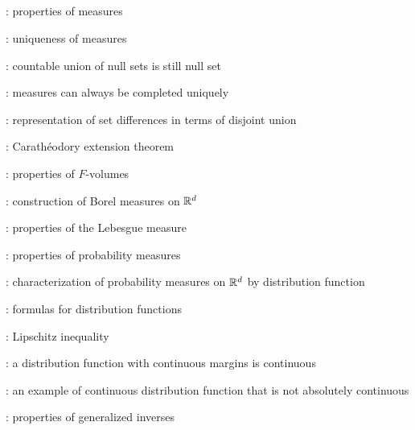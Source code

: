 \subsection*{}
\item {}: properties of measures
\item {}: uniqueness of measures
\item {}: countable union of null sets is still null set
\item {}: measures can always be completed uniquely
\item {}: representation of set differences in terms of disjoint union
\item {}: Carath\'eodory extension theorem
\item {}: properties of \(F\)-volumes
\item {}: construction of Borel measures on \(\mathbb{R}^d\)
\item {}: properties of the Lebesgue measure
\item {}: properties of probability measures
\item {}: characterization of probability
measures on \(\mathbb{R}^d\) by distribution function
\item {}: formulas for distribution functions
\item {}: Lipschitz inequality
\item {}: a distribution function with continuous margins is continuous
\item {}: an example of continuous distribution function that is not absolutely continuous
\item {}: properties of generalized inverses
